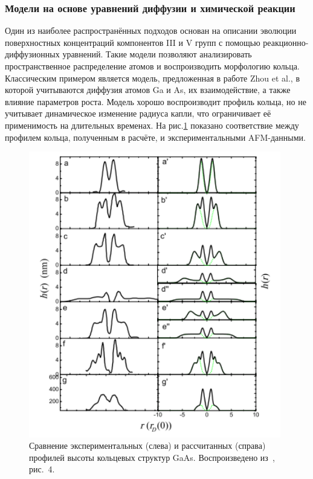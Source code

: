 \documentclass[14pt,oneside]{extarticle}
\begin{document}
\subsubsection*{Модели на основе уравнений диффузии и химической реакции}
Один из наиболее распространённых подходов основан на описании эволюции поверхностных концентраций компонентов III и V групп с помощью реакционно-диффузионных уравнений. Такие модели позволяют анализировать пространственное распределение атомов и воспроизводить морфологию кольца. Классическим примером является модель, предложенная в работе Zhou et al.\cite{zhou2013}, в которой учитываются диффузия атомов Ga и As, их взаимодействие, а также влияние параметров роста. Модель хорошо воспроизводит профиль кольца, но не учитывает динамическое изменение радиуса капли, что ограничивает её применимость на длительных временах. На рис.\ref{fig:zhou_profiles} показано соответствие между профилем кольца, полученным в расчёте, и экспериментальными AFM-данными.

\begin{figure}
    \begin{center}
        \includegraphics[width=11cm]{images/zhou_profiles.png}
        \caption{\label{fig:zhou_profiles}
            Сравнение экспериментальных (слева) и рассчитанных (справа) профилей высоты кольцевых структур GaAs. Воспроизведено из~\cite{zhou2013}, рис.~4.}
    \end{center}
\end{figure}
\end{document}
